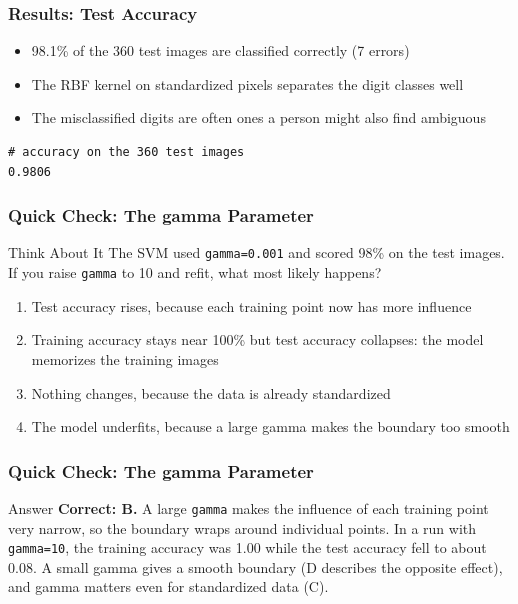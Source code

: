 \begin{frame}[fragile]\frametitle{Results: Test Accuracy}
\begin{itemize}
\item 98.1\% of the 360 test images are classified correctly (7 errors)
\item The RBF kernel on standardized pixels separates the digit classes well
\item The misclassified digits are often ones a person might also find ambiguous
\end{itemize}
\begin{lstlisting}
# accuracy on the 360 test images
0.9806
\end{lstlisting}
\end{frame}

\begin{frame}[fragile]\frametitle{Quick Check: The gamma Parameter}
\begin{block}{Think About It}
The SVM used \texttt{gamma=0.001} and scored 98\% on the test images. If you raise \texttt{gamma} to 10 and refit, what most likely happens?
\begin{enumerate}
  \item[A.] Test accuracy rises, because each training point now has more influence
  \item[B.] Training accuracy stays near 100\% but test accuracy collapses: the model memorizes the training images
  \item[C.] Nothing changes, because the data is already standardized
  \item[D.] The model underfits, because a large gamma makes the boundary too smooth
\end{enumerate}
\end{block}
\end{frame}

\begin{frame}[fragile]\frametitle{Quick Check: The gamma Parameter}
\begin{block}{Answer}
\textbf{Correct: B.} A large \texttt{gamma} makes the influence of each training point very narrow, so the boundary wraps around individual points. In a run with \texttt{gamma=10}, the training accuracy was 1.00 while the test accuracy fell to about 0.08. A small gamma gives a smooth boundary (D describes the opposite effect), and gamma matters even for standardized data (C).
\end{block}
\end{frame}